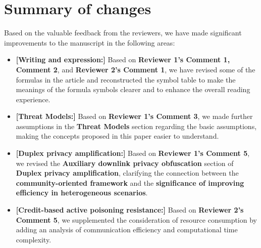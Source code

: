 \documentclass[a4paper,twoside,11pt,dvipsnames]{reviewresponse}
\begin{document}
\section{Summary of changes}
Based on the valuable feedback from the reviewers, we have made significant improvements to the manuscript in the following areas:
\color{red}
\begin{itemize}

\item \textbf{[Writing and expression:]} Based on \textbf{Reviewer 1's Comment 1, Comment 2}, and \textbf{Reviewer 2's Comment 1}, we have revised some of the formulas in the article and reconstructed the symbol table to make the meanings of the formula symbols clearer and to enhance the overall reading experience.

\item \textbf{[Threat Models:]} Based on \textbf{Reviewer 1's Comment 3}, we made further assumptions in the \textbf{Threat Models} section regarding the basic assumptions, making the concepts proposed in this paper easier to understand.


\item \textbf{[Duplex privacy amplification:]} Based on \textbf{Reviewer 1's Comment 5}, we revised the \textbf{Auxiliary downlink privacy obfuscation} section of \textbf{Duplex privacy amplification}, clarifying the connection between the \textbf{community-oriented framework} and the \textbf{significance of improving efficiency in heterogeneous scenarios}.


\item \textbf{[Credit-based active poisoning resistance:]} Based on \textbf{Reviewer 2's Comment 5}, we supplemented the consideration of resource consumption by adding an analysis of communication efficiency and computational time complexity.



\end{itemize}
\end{document}
